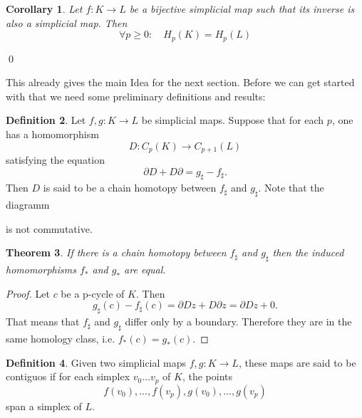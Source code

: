 \documentclass[draft,toc=bib]{scrartcl}
\theoremstyle{plain}
\newtheorem{theorem}{Theorem}[section]
\newtheorem{corollary}[theorem]{Corollary}
\theoremstyle{definition}
\newtheorem	{definition}[theorem]{Definition}
\theoremstyle{remark}
\begin{document}
\begin{corollary}\label{baby-case}
	Let $f: K\to L$ be a bijective simplicial map such that its inverse is also a simplicial map. Then \[
	\forall p\geq 0:\quad H_p(K)=H_p(L)
	\]
\end{corollary}\qed

This already gives the main Idea for the next section.
Before we can get started with that we need some preliminary definitions and results:


\begin{definition}
	Let $f,g:K\to L$ be simplicial maps. Suppose that for each $p$, one has a homomorphism \[
	D: C_p(K)\to C_{p+1}(L)
	\] satisfying the equation
	\[
	\partial D+D\partial=g_\sharp-f_\sharp.
	\]
	Then $D$ is said to be a chain homotopy between $f_\sharp$ and $g_\sharp$. Note that the diagramm
	\begin{center}
		
\end{center}
is not commutative.
\end{definition}

\begin{theorem}\label{chain_hom->invariant}%
	If there is a chain homotopy between $f_\sharp$ and $g_\sharp$ then the induced homomorphisms $f_\ast$ and $g_\ast$ are equal.
\end{theorem}

\begin{proof}
	Let $c$ be a p-cycle of $K$. Then
	\[
	g_\sharp(c)-f_\sharp(c)=\partial Dz+D\partial z=\partial Dz+0.
	\]
	That means that $f_\sharp$ and $g_\sharp$ differ only by a boundary. Therefore they are in the same homology class, i.e. $f_\ast(c)=g_\ast(c)$.
\end{proof}
\begin{definition}%
	Given two simplicial maps $f,g: K\to L$, these maps are said to be contiguos if for each simplex $v_0\dots v_p$ of $K$, the points \[
	f(v_0),\dots,f(v_p),g(v_0),\dots,g(v_p)
	\] span a simplex of $L$.
\end{definition}
\end{document}
